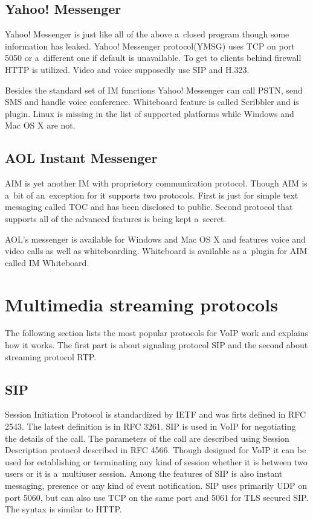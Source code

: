 \subsection*{Yahoo! Messenger}
Yahoo! Messenger is just like all of the above a~closed program though some information has leaked\cite{wikipediaYahoo}. Yahoo! Messenger protocol(YMSG) uses TCP on port 5050 or a~different one if default is unavailable. To get to clients behind firewall HTTP is utilized. Video and voice supposedly use SIP and H.323.

Besides the standard set of IM functions Yahoo! Messenger can call PSTN, send SMS and handle voice conference. Whiteboard feature is called Scribbler and is plugin. Linux is missing in the list of supported platforms while Windows and Mac OS X are not.

\subsection*{AOL Instant Messenger}
AIM is yet another IM with proprietory communication protocol. Though AIM is a~bit of an~exception for it supports two protocols. First is just for simple text messaging called TOC and has been disclosed to public. Second protocol that supports all of the advanced features is being kept a~secret.

AOL's messenger is available for Windows and Mac OS X and features voice and video calls as well as whiteboarding. Whiteboard is available as a~plugin for AIM called IM Whiteboard. 

\section{Multimedia streaming protocols}
The following section lists the most popular protocols for VoIP work and explains how it works. The first part is about signaling protocol SIP and the second about streaming protocol RTP.

\subsection*{SIP}
Session Initiation Protocol is standardized by IETF and was firts defined in RFC 2543. The latest definition is in RFC 3261. SIP is used in VoIP for negotiating the details of the call. The parameters of the call are described using Session Description protocol described in RFC 4566. Though designed for VoIP it can be used for establishing or terminating any kind of session whether it is between two users or it is a~multiuser session. Among the features of SIP is also instant messaging, presence or any kind of event notification. SIP uses primarily UDP on port 5060, but can also use TCP on the same port and 5061 for TLS secured SIP. The syntax is similar to HTTP.

